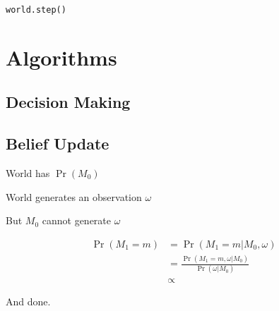 \documentclass{book}
\begin{document}
\begin{verbatim}
world.step()
\end{verbatim}

\section{Algorithms}

\subsection{Decision Making}

\subsection{Belief Update}

World has $\Pr(M_0)$

World generates an observation $\omega$

But $M_0$ cannot generate $\omega$

\begin{align}
\Pr(M_1=m)&=\Pr(M_1=m|M_0,\omega)\\
&=\frac{\Pr(M_1=m,\omega|M_0)}{\Pr(\omega|M_0)}\\
&\propto 
\end{align}

And done.
\end{document}
